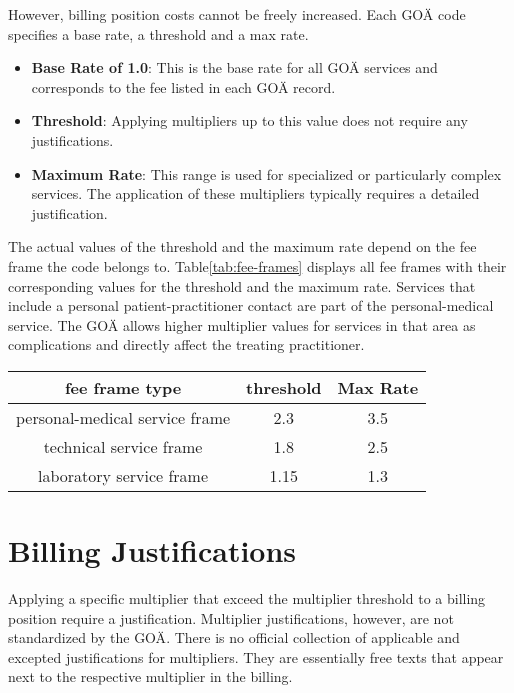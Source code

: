 However, billing position costs cannot be freely increased.
Each GOÄ code specifies a base rate, a threshold and a max rate\cite[]{bruck1998kommentar}.

\begin{itemize}
    \item \textbf{Base Rate of 1.0}: This is the base rate for all GOÄ services and corresponds to the fee listed in each GOÄ record.
    \item \textbf{Threshold}: Applying multipliers up to this value does not require any justifications.
    \item \textbf{Maximum Rate}: This range is used for specialized or particularly complex services.
    The application of these multipliers typically requires a detailed justification.
\end{itemize}

The actual values of the threshold and the maximum rate depend on the fee frame the code belongs to.
Table\ref{tab:fee-frames} displays all fee frames with their corresponding values for the threshold and the maximum rate\cite{hermanns2013bemessung}.
Services that include a personal patient-practitioner contact are part of the personal-medical service.
The GOÄ allows higher multiplier values for services in that area as complications and directly affect the treating practitioner.


\begin{center}
    \begin{tabular}{ |c|c|c| }\label{tab:fee-frames}
        \hline
        fee frame type & threshold & Max Rate \\
        \hline
        personal-medical service frame & 2.3 & 3.5 \\
        technical service frame & 1.8 & 2.5 \\
        laboratory service frame & 1.15 & 1.3 \\
        \hline
    \end{tabular}
\end{center}

\section{Billing Justifications}\label{sec:billing-justifications}

Applying a specific multiplier that exceed the multiplier threshold to a billing position require a justification.
Multiplier justifications, however, are not standardized by the GOÄ\cite[]{bruck1998kommentar}.
There is no official collection of applicable and excepted justifications for multipliers.
They are essentially free texts that appear next to the respective multiplier in the billing.

